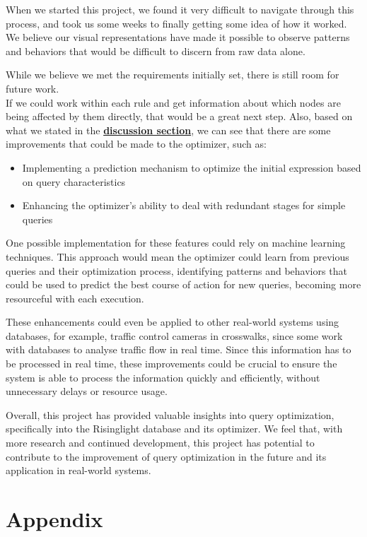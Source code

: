 \documentclass[a4paper,12pt]{scrreprt}
\begin{document}
When we started this project, we found it very difficult to navigate through this process, and took us some weeks to finally getting some idea of how it worked. \\
We believe our visual representations have made it possible to observe patterns and behaviors that would be difficult to discern from raw data alone.

While we believe we met the requirements initially set, there is still room for future work.\\
If we could work within each rule and get information about which nodes are being affected by them directly, that would be a great next step. 
Also, based on what we stated in the \textbf{\hyperref[chap:discussion]{discussion section}}, we can see that there are some improvements that could be made to the optimizer, such as:
\begin{itemize}
    \item Implementing a prediction mechanism to optimize the initial expression based on query characteristics
    \item Enhancing the optimizer's ability to deal with redundant stages for simple queries
\end{itemize}

One possible implementation for these features could rely on machine learning techniques. This approach would mean the optimizer could learn from previous queries and their optimization process, identifying patterns and behaviors that could be used to predict the best course of action for new queries, becoming more resourceful with each execution.

These enhancements could even be applied to other real-world systems using databases, for example, traffic control cameras in crosswalks, since some work with databases to analyse traffic flow in real time. Since this information has to be processed in real time, these improvements could be crucial to ensure the system is able to process the information quickly and efficiently, without unnecessary delays or resource usage.

Overall, this project has provided valuable insights into query optimization, specifically into the Risinglight database and its optimizer. We feel that, with more research and continued development, this project has potential to contribute to the improvement of query optimization in the future and its application in real-world systems. 

\appendix

\chapter{Appendix}
\thispagestyle{fancy}
\end{document}
